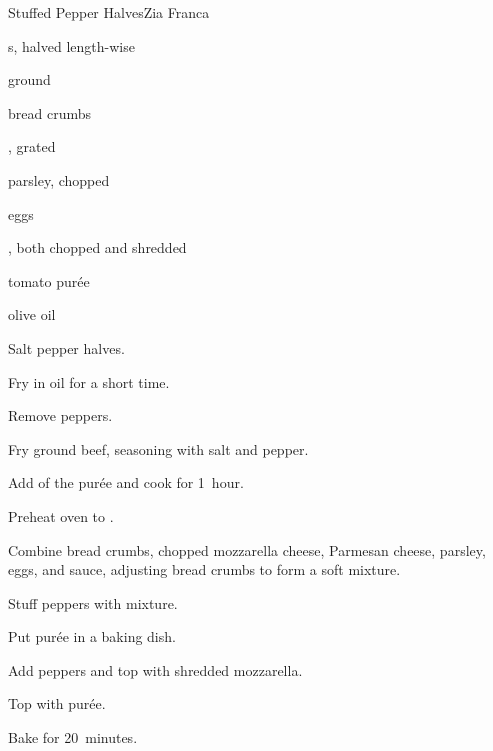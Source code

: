 \begin{recipe}{Stuffed Pepper Halves}{Zia Franca}{}

\begin{ingredients}
\item {}s, halved length-wise
\item ground 
\item bread crumbs
\item {}, grated
\item parsley, chopped
\item eggs
\item {}, both chopped and shredded
\item tomato purée
\item olive oil
\end{ingredients}

\begin{directions}
\item Salt pepper halves.
\item Fry in oil for a short time.
\item Remove peppers.
\item Fry ground beef, seasoning with salt and pepper.
\item Add \half{} of the purée and cook for 1~hour.
\item Preheat oven to .
\item Combine bread crumbs, chopped mozzarella cheese, Parmesan cheese, parsley, eggs, and sauce, adjusting bread crumbs to form a soft mixture.
\item Stuff peppers with mixture.
\item Put purée in a baking dish.
\item Add peppers and top with shredded mozzarella.
\item Top with purée.
\item Bake for 20~minutes.
\end{directions}

\end{recipe}

